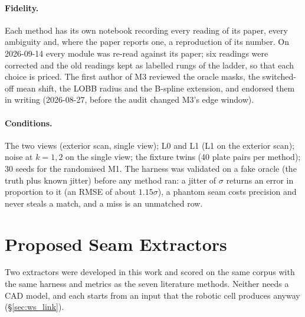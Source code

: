 \paragraph{Fidelity.} Each method has its own notebook recording every reading of its paper,
every ambiguity and, where the paper reports one, a reproduction of its number. On
2026-09-14 every module was re-read against its paper; six readings were corrected and the
old readings kept as labelled rungs of the ladder, so that each choice is priced. The first
author of M3 reviewed the oracle masks, the switched-off mean shift, the LOBB radius and the
B-spline extension, and endorsed them in writing (2026-08-27, before the audit changed M3's edge
window).

\paragraph{Conditions.} The two views (exterior scan, single view); L0 and L1 (L1 on the
exterior scan); noise at $k=1,2$ on the single view; the fixture twins (40 plate pairs per
method); 30 seeds for the randomised M1. The harness was validated on a fake oracle (the
truth plus known jitter) before any method ran: a jitter of $\sigma$ returns an error in proportion
to it (an RMSE of about $1.15\sigma$), a phantom seam costs precision and never steals a match, and a miss is an unmatched
row.

\section{Proposed Seam Extractors}
\label{sec:ws_own}
Two extractors were developed in this work and scored on the same corpus with the same
harness and metrics as the seven literature methods. Neither needs a CAD model, and each
starts from an input that the robotic cell produces anyway (\S\ref{sec:ws_link}).

